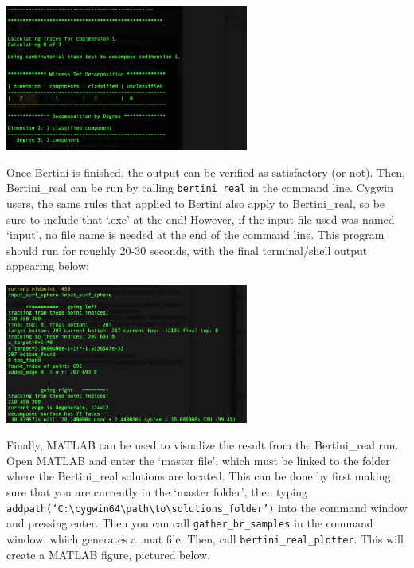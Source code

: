 \begin{center}\begin{minipage}{0.9\linewidth}
\centering
\includegraphics[width=0.6\textwidth]{CayleyCubicBertiniRun.png}
\end{minipage}\end{center}

Once Bertini is finished, the output can be verified as satisfactory (or not). Then, Bertini\_real can be run by calling \texttt{bertini\_real} in the command line. Cygwin users, the same rules that applied to Bertini also apply to Bertini\_real, so be sure to include that `.exe' at the end! However, if the input file used was named `input', no file name is needed at the end of the command line. This program should run for roughly 20-30 seconds, with the final terminal/shell output appearing below:

\begin{center}\begin{minipage}{0.9\linewidth}
\centering
\includegraphics[width=0.6\textwidth]{CayleyCubicBertiniRealRun}
\end{minipage}\end{center}

Finally, MATLAB can be used to visualize the result from the Bertini\_real run. Open MATLAB and enter the `master file', which must be linked to the folder where the Bertini\_real solutions are located. This can be done by first making sure that you are currently in the `master folder', then typing \texttt{addpath(`C:\textbackslash{cygwin64}\textbackslash{path}\textbackslash{to}\textbackslash{solutions\_folder}')} into the command window and pressing enter. Then you can call \texttt{gather\_br\_samples} in the command window, which generates a .mat file. Then, call \texttt{bertini\_real\_plotter\-}. This will create a MATLAB figure, pictured below.

